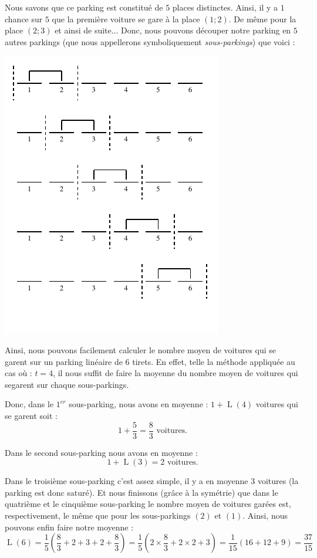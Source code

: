 \documentclass[a4paper,francais,11pt]{article}
\begin{document}
Nous savons que ce parking est constitué de $5$ places distinctes. Ainsi, il y a $1$ chance sur $5$ que la première voiture se gare à la place $(1;2)$. De même pour la place $(2;3)$ et ainsi de suite... Donc, nous pouvons découper notre parking en $5$ autres parkings (que nous appellerons symboliquement \emph{sous-parkings}) que voici :
\begin{center}
\includegraphics{fig14.pdf}
\end{center}

Ainsi, nous pouvons facilement calculer le nombre moyen de voitures qui se garent sur un parking linéaire de $6$ tirets. En effet, telle la méthode appliquée au cas où : $t=4$, il nous suffit de faire la moyenne du nombre moyen de voitures qui segarent sur chaque sous-parkings.

Donc, dans le $1^{er}$ sous-parking, nous avons en moyenne : $1+\operatorname{L}\left(4\right)$ voitures qui se garent soit :
\[1+\frac{5}{3}=\frac{8}{3}\text{ voitures.}\]

Dans le second sous-parking nous avons en moyenne :
\[1+\operatorname{L}\left(3\right)=2\text{ voitures.}\]

Dans le troisième sous-parking c'est assez simple, il y a en moyenne $3$ voitures (la parking est donc saturé). Et nous finissons (grâce à la symétrie) que dans le quatrième et le cinquième sous-parking le nombre moyen de voitures garées est, respectivement, le même que pour les sous-parkings $(2)$ et $(1)$. Ainsi, nous pouvons enfin faire notre moyenne :
\[\operatorname{L}\left(6\right)=\frac{1}{5}\left(\frac{8}{3}+2+3+2+\frac{8}{3}\right)=\frac{1}{5}\left(2\times\frac{8}{3}+2\times2+3\right)=\frac{1}{15}\left(16+12+9\right)=\frac{37}{15}\]
\end{document}
